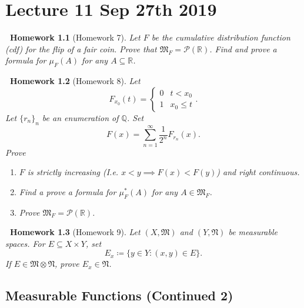 \documentclass[notoc,notitlepage]{tufte-book}
\newtheorem*{homework}{\faCogs\ Homework}
\begin{document}

\chapter{Lecture 11 Sep 27th 2019}%
\label{chp:lecture_11_sep_27th_2019}

\begin{homework}[Homework 7]\label{homework:7}
  Let $F$ be the cumulative distribution function (cdf)
  for the flip of a fair coin.
  Prove that $\mathfrak{M}_F = \mathcal{P}(\mathbb{R})$.
  Find and prove a formula for $\mu_F(A)$ for any $A \subseteq \mathbb{R}$.
\end{homework}

\begin{homework}[Homework 8]\label{homework:8}
  Let
  \begin{equation*}
    F_{x_0}(t) = \begin{cases}
      0 & t < x_0 \\
      1 & x_0 \leq t
    \end{cases}.
  \end{equation*}
  Let $\{ r_n \}_{n}$ be an enumeration of $\mathbb{Q}$.
  Set
  \begin{equation*}
    F(x) = \sum_{n=1}^{\infty} \frac{1}{2^n} F_{r_n}(x).
  \end{equation*}
  Prove
  \begin{enumerate}
    \item $F$ is strictly increasing (I.e. $x < y \implies F(x) < F(y)$)
      and right continuous.
    \item Find a prove a formula for $\mu_F^*(A)$ for any $A \in \mathfrak{M}_F$.
    \item Prove $\mathfrak{M}_F = \mathcal{P}(\mathbb{R})$.
  \end{enumerate}
\end{homework}

\begin{homework}[Homework 9]\label{homework:9}
  Let $(X, \mathfrak{M})$ and $(Y, \mathfrak{N})$ be measurable spaces.
  For $E \subseteq X \times Y$, set
  \begin{equation*}
    E_x \coloneqq \{ y \in Y : (x, y) \in E \}.
  \end{equation*}
  If $E \in \mathfrak{M} \otimes \mathfrak{N}$, prove $E_x \in \mathfrak{N}$.
\end{homework}

\section{Measurable Functions (Continued 2)}%
\label{sec:measurable_functions_continued_2}
\end{document}
